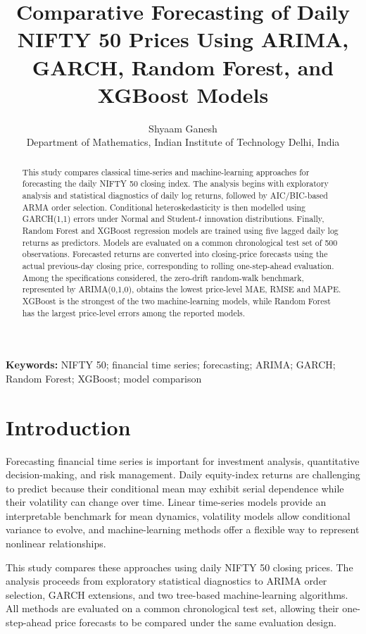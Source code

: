 \documentclass[10pt,a4paper]{article}
\title{Comparative Forecasting of Daily NIFTY 50 Prices Using ARIMA, GARCH, Random Forest, and XGBoost Models}
\author{Shyaam Ganesh\\[-1pt]
\small Department of Mathematics, Indian Institute of Technology Delhi, India}
\date{}
\begin{document}
\maketitle
\begin{abstract}
This study compares classical time-series and machine-learning approaches for forecasting the daily NIFTY 50 closing index. The analysis begins with exploratory analysis and statistical diagnostics of daily log returns, followed by AIC/BIC-based ARMA order selection. Conditional heteroskedasticity is then modelled using GARCH(1,1) errors under Normal and Student-$t$ innovation distributions. Finally, Random Forest and XGBoost regression models are trained using five lagged daily log returns as predictors. Models are evaluated on a common chronological test set of 500 observations. Forecasted returns are converted into closing-price forecasts using the actual previous-day closing price, corresponding to rolling one-step-ahead evaluation. Among the specifications considered, the zero-drift random-walk benchmark, represented by ARIMA(0,1,0), obtains the lowest price-level MAE, RMSE and MAPE. XGBoost is the strongest of the two machine-learning models, while Random Forest has the largest price-level errors among the reported models.
\end{abstract}
\vspace{-0.4em}
\noindent\textbf{Keywords:} NIFTY 50; financial time series; forecasting; ARIMA; GARCH; Random Forest; XGBoost; model comparison
\vspace{0.8em}


\section{Introduction}

Forecasting financial time series is important for investment analysis, quantitative decision-making, and risk management. Daily equity-index returns are challenging to predict because their conditional mean may exhibit serial dependence while their volatility can change over time. Linear time-series models provide an interpretable benchmark for mean dynamics, volatility models allow conditional variance to evolve, and machine-learning methods offer a flexible way to represent nonlinear relationships.

This study compares these approaches using daily NIFTY 50 closing prices. The analysis proceeds from exploratory statistical diagnostics to ARIMA order selection, GARCH extensions, and two tree-based machine-learning algorithms. All methods are evaluated on a common chronological test set, allowing their one-step-ahead price forecasts to be compared under the same evaluation design.
\end{document}
